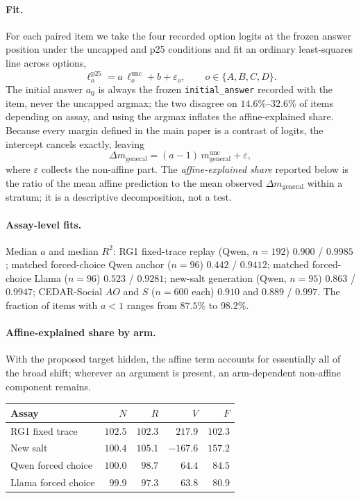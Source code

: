 \documentclass[letterpaper]{article}
\begin{document}
\paragraph{Fit.}
For each paired item we take the four recorded option logits at the frozen answer position under the uncapped and p25 conditions and fit an ordinary least-squares line across options,
\begin{equation}
\ell^{\mathrm{p25}}_{o}=a\,\ell^{\mathrm{unc}}_{o}+b+\varepsilon_{o},\qquad o\in\{A,B,C,D\}.
\end{equation}
The initial answer $a_0$ is always the frozen \texttt{initial\_answer} recorded with the item, never the uncapped argmax; the two disagree on $14.6\%$--$32.6\%$ of items depending on assay, and using the argmax inflates the affine-explained share. Because every margin defined in the main paper is a contrast of logits, the intercept cancels exactly, leaving
\begin{equation}
\Delta m_{\mathrm{general}}=(a-1)\,m^{\mathrm{unc}}_{\mathrm{general}}+\varepsilon,
\end{equation}
where $\varepsilon$ collects the non-affine part. The \emph{affine-explained share} reported below is the ratio of the mean affine prediction to the mean observed $\Delta m_{\mathrm{general}}$ within a stratum; it is a descriptive decomposition, not a test.

\paragraph{Assay-level fits.}
Median $a$ and median $R^{2}$: RG1 fixed-trace replay (Qwen, $n=192$) $0.900$ / $0.9985$; matched forced-choice Qwen anchor ($n=96$) $0.442$ / $0.9412$; matched forced-choice Llama ($n=96$) $0.523$ / $0.9281$; new-salt generation (Qwen, $n=95$) $0.863$ / $0.9947$; CEDAR-Social $AO$ and $S$ ($n=600$ each) $0.910$ and $0.889$ / $0.997$. The fraction of items with $a<1$ ranges from $87.5\%$ to $98.2\%$.

\paragraph{Affine-explained share by arm.}
With the proposed target hidden, the affine term accounts for essentially all of the broad shift; wherever an argument is present, an arm-dependent non-affine component remains.

\begin{center}
\small
\begin{tabular}{@{}lrrrr@{}}
\toprule
Assay & $N$ & $R$ & $V$ & $F$ \\
\midrule
RG1 fixed trace & $102.5$ & $102.3$ & $217.9$ & $102.3$ \\
New salt & $100.4$ & $105.1$ & $-167.6$ & $157.2$ \\
Qwen forced choice & $100.0$ & $98.7$ & $64.4$ & $84.5$ \\
Llama forced choice & $99.9$ & $97.3$ & $63.8$ & $80.9$ \\
\bottomrule
\end{tabular}
\end{center}
\end{document}

